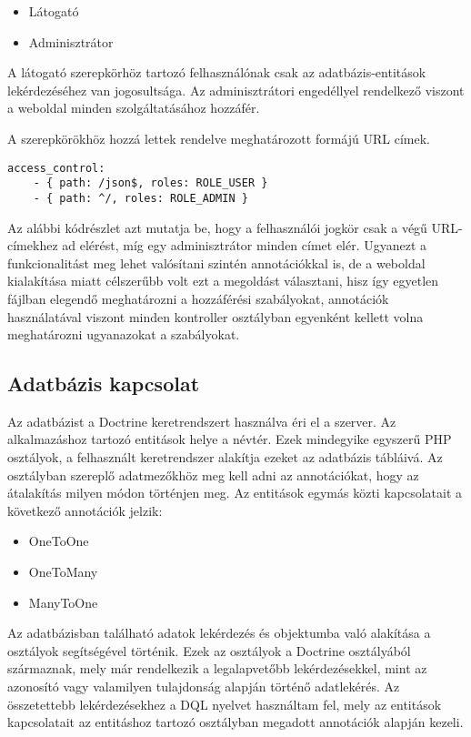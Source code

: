 \begin{itemize}
	\item Látogató
	\item Adminisztrátor
\end{itemize}

A látogató szerepkörhöz tartozó felhasználónak csak az adatbázis-entitások lekérdezéséhez van jogosultsága. 
Az adminisztrátori engedéllyel rendelkező viszont a weboldal minden szolgáltatásához hozzáfér. 

A szerepkörökhöz hozzá lettek rendelve meghatározott formájú URL címek. 

\begin{lstlisting}
access_control:
    - { path: /json$, roles: ROLE_USER }
    - { path: ^/, roles: ROLE_ADMIN }
\end{lstlisting}

Az alábbi kódrészlet azt mutatja be, hogy a felhasználói jogkör csak a  végű URL-címekhez ad elérést, míg egy adminisztrátor minden címet elér. 
Ugyanezt a funkcionalitást meg lehet valósítani szintén annotációkkal is, de a weboldal kialakítása miatt célszerűbb volt ezt a megoldást választani, hisz így egyetlen fájlban elegendő meghatározni a hozzáférési szabályokat, annotációk használatával viszont minden kontroller osztályban egyenként kellett volna meghatározni ugyanazokat a szabályokat.

\subsection*{Adatbázis kapcsolat}
\label{adatbazis}

Az adatbázist a Doctrine keretrendszert használva éri el a szerver. 
Az alkalmazáshoz tartozó entitások helye a  névtér. 
Ezek mindegyike egyszerű PHP osztályok, a felhasznált keretrendszer alakítja ezeket az adatbázis tábláivá. 
Az osztályban szereplő adatmezőkhöz meg kell adni az annotációkat, hogy az átalakítás milyen módon történjen meg. 
Az entitások egymás közti kapcsolatait a következő annotációk jelzik:

\begin{itemize}
	\item OneToOne
	\item OneToMany
	\item ManyToOne
\end{itemize}

Az adatbázisban található adatok lekérdezés és objektumba való alakítása a  osztályok segítségével történik. 
Ezek az osztályok a Doctrine  osztályából származnak, mely már rendelkezik a legalapvetőbb lekérdezésekkel, mint az azonosító vagy valamilyen tulajdonság alapján történő adatlekérés. 
Az összetettebb lekérdezésekhez a DQL nyelvet használtam fel, mely az entitások kapcsolatait az entitáshoz tartozó osztályban megadott annotációk alapján kezeli. 

